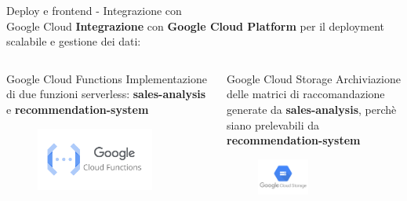 \documentclass{beamer}
\begin{document}
	\begin{frame}{Deploy e frontend - Integrazione con\\ Google Cloud}
		\textbf{Integrazione} con \textbf{Google Cloud Platform} per il deployment scalabile e gestione dei dati:

		\begin{columns}
			\begin{column}{0.42\textwidth}
				\begin{exampleblock}{Google Cloud Functions}
					Implementazione di due funzioni serverless: \textbf{sales-analysis} e \textbf{recommendation-system}
				\end{exampleblock}
				
				\begin{figure}
					\centering
					\includegraphics[width=0.81\textwidth]{Google-Cloud-Functions.png}
				\end{figure}
			\end{column}
			\begin{column}{0.58\textwidth}
				\begin{exampleblock}{Google Cloud Storage}
					Archiviazione delle matrici di raccomandazione generate da \textbf{sales-analysis}, perchè siano prelevabili da \textbf{recommendation-system}
				\end{exampleblock}
				
				\begin{figure}
					\centering
					\includegraphics[width=0.45\textwidth]{Google-Cloud-Storage.png}
				\end{figure}
			\end{column}
		\end{columns}
	\end{frame}
\end{document}
